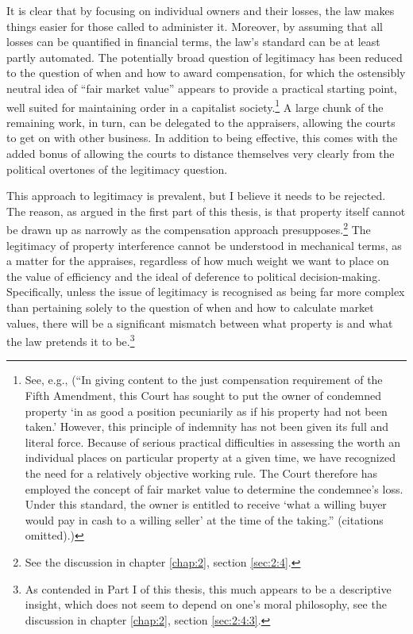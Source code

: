 {It is clear that by focusing on individual owners and their losses, the law makes things easier for those called to administer it. Moreover, by assuming that all losses can be quantified in financial terms, the law's standard can be at least partly automated. The potentially broad question of legitimacy has been reduced to the question of when and how to award compensation, for which the ostensibly neutral idea of ``fair market value'' appears to provide a practical starting point, well suited for maintaining order in a capitalist society.\footnote{See, e.g., \cite[510-511]{acres79} (``In giving content to the just compensation requirement of the Fifth Amendment, this Court has sought to put the owner of condemned property `in as good a position pecuniarily as if his property had not been taken.' However, this principle of indemnity has not been given its full and literal force. Because of serious practical difficulties in assessing the worth an individual places on particular property at a given time, we have recognized the need for a relatively objective working rule. The Court therefore has employed the concept of fair market value to determine the condemnee's loss. Under this standard, the owner is entitled to receive `what a willing buyer would pay in cash to a willing seller' at the time of the taking.'' (citations omitted).)} A large chunk of the remaining work, in turn, can be delegated to the appraisers, allowing the courts to get on with other business. In addition to being effective, this comes with the added bonus of allowing the courts to distance themselves very clearly from the political overtones of the legitimacy question.

This approach to legitimacy is prevalent, but I believe it needs to be rejected. The reason, as argued in the first part of this thesis, is that property itself cannot be drawn up as narrowly as the compensation approach presupposes.\footnote{See the discussion in chapter \ref{chap:2}, section \ref{sec:2:4}.} The legitimacy of property interference cannot be understood in mechanical terms, as a matter for the appraises, regardless of how much weight we want to place on the value of efficiency and the ideal of deference to political decision-making. Specifically, unless the issue of legitimacy is recognised as being far more complex than pertaining solely to the question of when and how to calculate market values, there will be a significant mismatch between what property is and what the law pretends it to be.\footnote{As contended in Part I of this thesis, this much appears to be a descriptive insight, which does not seem to depend on one's moral philosophy, see the discussion in chapter \ref{chap:2}, section \ref{sec:2:4:3}.}
}
